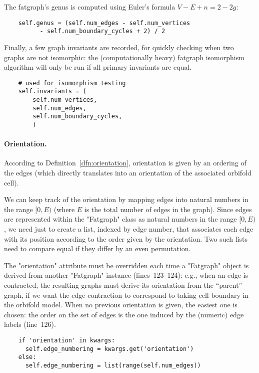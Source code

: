 The fatgraph's genus is computed using Euler's formula $V-E+n = 2-2g$:
\begin{lstlisting}
    self.genus = (self.num_edges - self.num_vertices
          - self.num_boundary_cycles + 2) / 2

\end{lstlisting}
Finally, a few graph invariants are recorded, for quickly
checking when two graphs are not isomorphic: the (computationally
heavy) fatgraph isomorphism algorithm will only be run if all primary
invariants are equal.
\begin{lstlisting}
    # used for isomorphism testing
    self.invariants = (
        self.num_vertices,
        self.num_edges,
        self.num_boundary_cycles,
        )

\end{lstlisting}


\paragraph{Orientation.}
According to Definition~\ref{dfn:orientation}, orientation is given by an
ordering of the edges (which directly translates into an orientation
of the associated orbifold cell).

We can keep track of the orientation by mapping edges into natural
numbers in the range $[0, E)$ (where $E$ is the total number of edges
in the graph).  Since edges are represented within the "Fatgraph"
class as natural numbers in the range $[0, E)$, we need just to create
a list, indexed by edge number, that associates each edge with its
position according to the order given by the orientation.  Two such
lists need to compare equal if they differ by an even permutation.

The "orientation" attribute must be overridden each time a "Fatgraph"
object is derived from another "Fatgraph" instance (lines~123--124): e.g., when an edge
is contracted, the resulting graphs must derive its orientation from
the ``parent'' graph, if we want the edge contraction to correspond to
taking cell boundary in the orbifold model.  When no previous
orientation is given, the easiest one is chosen: the order on the set
of edges is the one induced by the (numeric) edge labels (line~126).
\begin{lstlisting}
    if 'orientation' in kwargs:
      self.edge_numbering = kwargs.get('orientation')
    else:
      self.edge_numbering = list(range(self.num_edges))

\end{lstlisting}

